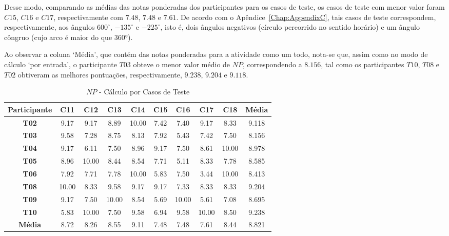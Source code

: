 Desse modo, comparando as médias das notas ponderadas dos participantes para os casos de teste, os casos de teste com menor valor foram $C15$, $C16$ e $C17$, respectivamente com $7.48$, $7.48$ e $7.61$. De acordo com o Apêndice~\ref{Chap:AppendixC}, tais casos de teste correspondem, respectivamente, aos ângulos $600^{\circ}$, $-135^{\circ}$ e $-225^{\circ}$, isto é, dois ângulos negativos (círculo percorrido no sentido horário) e um ângulo côngruo (cujo arco é maior do que 360°).

Ao observar a coluna `Média', que contém das notas ponderadas para a atividade como um todo, nota-se que, assim como no modo de cálculo `por entrada', o participante $T03$ obteve o menor valor médio de $NP$, correspondendo a $8.156$, tal como os participantes $T10$, $T08$ e $T02$ obtiveram as melhores pontuações, respectivamente, $9.238$, $9.204$ e $9.118$.

\begin{table}[htbp]
	\centering
	\caption{$NP$ - Cálculo por Casos de Teste}
	\begin{tabular}{|c|c|c|c|c|c|c|c|c|c|}
		\hline
		\rowcolor[HTML]{D9D9D9} 
		\cellcolor[HTML]{D0CECE}\textbf{Participante} & \textbf{C11} & \textbf{C12} & \textbf{C13} & \textbf{C14} & \textbf{C15} & \textbf{C16} & \textbf{C17} & \textbf{C18} & \textbf{Média} \\ \hline
		\textbf{T02} & 9.17 & 9.17 & 8.89 & 10.00 & 7.42 & 7.40 & 9.17 & 8.33 & 9.118 \\ \hline
		\rowcolor[HTML]{F2F2F2} 
		\textbf{T03} & 9.58 & 7.28 & 8.75 & 8.13 & 7.92 & 5.43 & 7.42 & 7.50 & 8.156 \\ \hline
		\textbf{T04} & 9.17 & 6.11 & 7.50 & 8.96 & 9.17 & 7.50 & 8.61 & 10.00 & 8.978 \\ \hline
		\rowcolor[HTML]{F2F2F2} 
		\textbf{T05} & 8.96 & 10.00 & 8.44 & 8.54 & 7.71 & 5.11 & 8.33 & 7.78 & 8.585 \\ \hline
		\textbf{T06} & 7.92 & 7.71 & 7.78 & 10.00 & 5.83 & 7.50 & 3.44 & 10.00 & 8.413 \\ \hline
		\rowcolor[HTML]{F2F2F2} 
		\textbf{T08} & 10.00 & 8.33 & 9.58 & 9.17 & 9.17 & 7.33 & 8.33 & 8.33 & 9.204 \\ \hline
		\textbf{T09} & 9.17 & 7.50 & 10.00 & 8.54 & 5.69 & 10.00 & 5.61 & 7.08 & 8.695 \\ \hline
		\rowcolor[HTML]{F2F2F2} 
		\textbf{T10} & 5.83 & 10.00 & 7.50 & 9.58 & 6.94 & 9.58 & 10.00 & 8.50 & 9.238 \\ \hline
		\rowcolor[HTML]{D0CECE} 
		\textbf{Média} & 8.72 & 8.26 & 8.55 & 9.11 & 7.48 & 7.48 & 7.61 & 8.44 & 8.821 \\ \hline
	\end{tabular}
	\label{tab:F3_A2_NP_CASOS_}
\end{table}



